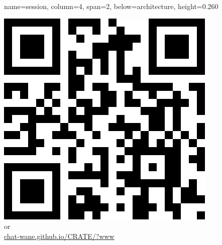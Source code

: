 \documentclass[a1paper, fontscale=0.4, portrait]{baposter}
\newcommand{\THIRDROW}{0.260}
\begin{document}
\begin{poster}
  {name=session, column=4, span=2, below=architecture, height=\THIRDROW} {
    \begin{center}
      \includegraphics[scale=0.25]{img/qrcode.png}
      \\or\\
      \url{chat-wane.github.io/CRATE/?www}
    \end{center}
  }

\end{poster}
\end{document}
